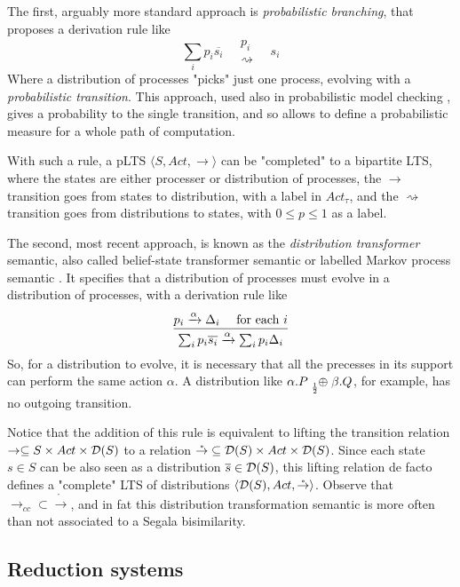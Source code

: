The first, arguably more standard approach is \textit{probabilistic branching}, that proposes a derivation rule like
\[ \sum_i p_i \overline{s_i} \quad
\substack{  p_i  \\  \rightsquigarrow } 
\quad s_i \]
Where a distribution of processes "picks" just one process, evolving with a \textit{probabilistic transition}. This approach, used also in probabilistic model checking \cite{kwiatkowskaPRISMVerificationProbabilistic2011}, gives a probability to the single transition, and so allows to define a probabilistic measure for a whole path of computation.

With such a rule, a pLTS $\langle S, Act, \rightarrow\rangle$ can be "completed" to a bipartite LTS, where the states are either processer or distribution of processes, the $\rightarrow$ transition goes from states to distribution, with a label in $Act_\tau$, and the $\rightsquigarrow$ transition goes from distributions to states, with $0 \leq p \leq 1$ as a label. 

The second, most recent approach, is known as the \textit{distribution transformer} semantic, also called belief-state transformer semantic or labelled Markov process semantic . It specifies that a distribution of processes must evolve in a distribution of processes, with a derivation rule like 
\[ \infer{ \sum_i p_i \overline{s_i} \xrightarrow{\alpha} \sum_i p_i \Delta_i}
  { p_i \xrightarrow{\alpha} \Delta_i & \text{ for each  }i }
\]
So, for a distribution to evolve, it is necessary that all the precesses in its support can perform the same action $\alpha$. A distribution like $\alpha.P \psum{\frac{1}{2}} \beta.Q$, for example, has no outgoing transition.

Notice that the addition of this rule is equivalent to lifting the transition relation $\rightarrow \subseteq S \times Act \times \mathcal{D}(S)$ to a relation $\mathring{\rightarrow} \subseteq \mathcal{D}(S) \times Act \times \mathcal{D}(S)$. Since each state $s \in S$ can be also seen as a distribution $\overline{s} \in \mathcal{D}(S)$, this lifting relation de facto defines a "complete" LTS of distributions $\langle \mathcal{D}(S), Act, \mathring{\rightarrow}\rangle$. Observe that $\rightarrow_{cc} \subset \mathring{\rightarrow}$, and in fat this distribution transformation semantic is more often than not associated to a Segala bisimilarity.



\subsection{Reduction systems}\label{bkg_reduction_system}


